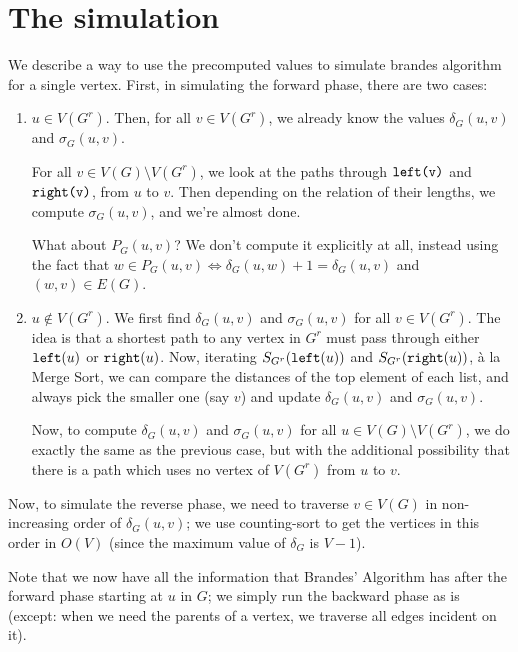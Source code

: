 \section{The simulation}
We describe a way to use the precomputed values to simulate brandes
algorithm for a single vertex.
First, in simulating the forward phase, there are two cases:

\begin{enumerate}[I]
	\item
		$u \in V(G^r)$.
		Then, for all $v \in V(G^r)$, we already know the values
		$\delta_G(u, v)$ and $\sigma_G(u, v)$.

		For all $v \in V(G) \setminus V(G^r)$, we look at the paths
		through $\texttt{left(v)}$ and $\texttt{right(v)}$, from $u$ to $v$.
		Then depending on the relation of their lengths, we compute
		$\sigma_G(u, v)$, and we're almost done.
		
		What about $P_G(u, v)$? We don't compute it explicitly at all,
		instead using the fact that
		$w \in P_G(u, v) \iff \delta_G(u, w) + 1 = \delta_G(u, v)$ and
		$(w, v) \in E(G)$.
	\item
		$u \notin V(G^r)$.
		We first find $\delta_G(u, v)$ and $\sigma_G(u, v)$
		for all $v \in V(G^r)$.
		The idea is that a shortest path to any vertex in $G^r$ must
		pass through either $\texttt{left}(u)$ or $\texttt{right}(u)$.
		Now, iterating $S_{G^r}(\texttt{left}(u))$ and $S_{G^r}(\texttt{right}(u))$,
		à la Merge Sort, we can compare the distances of the top element
		of each list, and always pick the smaller one (say $v$) and update
		$\delta_G(u, v)$ and $\sigma_G(u, v)$.

		Now, to compute $\delta_G(u, v)$ and $\sigma_G(u, v)$
		for all $u \in V(G) \setminus V(G^r)$, we do exactly the same as
		the previous case, but with the additional possibility that
		there is a path which uses no vertex of $V(G^r)$ from $u$ to $v$.
\end{enumerate}

Now, to simulate the reverse phase, we need to traverse $v\in V(G)$
in non-increasing order of $\delta_G(u, v)$; we use counting-sort to get
the vertices in this order in $O(V)$
(since the maximum value of $\delta_G$ is $V - 1$).

Note that we now have all the information that Brandes' Algorithm has after
the forward phase starting at $u$ in $G$; we simply run the backward phase
as is (except: when we need the parents of a vertex, we traverse all edges
incident on it).
